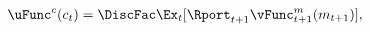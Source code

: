   \begin{equation}\begin{gathered}\begin{aligned}
        \uFunc^{c}(c_{t})  & = \DiscFac \Ex_{t} [{\Rport}_{t+1} \vFunc^{m}_{t+1}(m_{t+1})] \label{eq:valfuncFOCRtilde},
      \end{aligned}\end{gathered}\end{equation}
